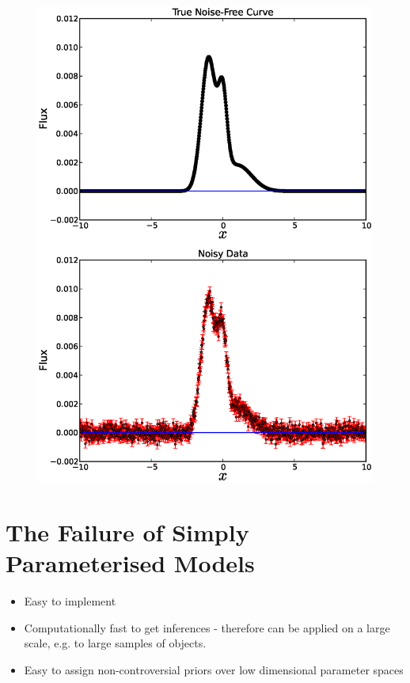 \documentclass[letterpaper, 11pt]{article}
\begin{document}
\begin{figure}
\begin{center}
\includegraphics[scale=0.5]{emission_line.eps}
\end{center}
\end{figure}

\section{The Failure of Simply Parameterised Models}
\begin{itemize}
\item Easy to implement \\
\item Computationally fast to get inferences - therefore can be applied on a large scale, e.g. to large samples of objects. \\
\item Easy to assign non-controversial priors over low dimensional parameter spaces \\
\end{itemize}
\end{document}
